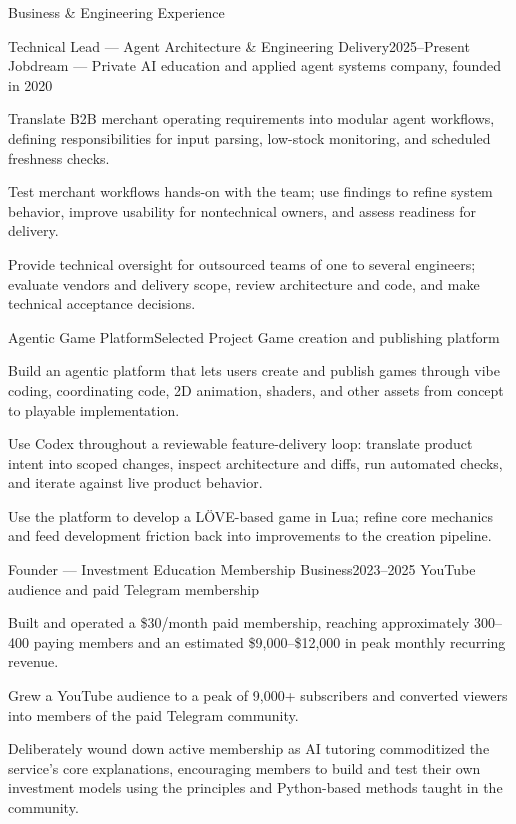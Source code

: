 \documentclass{resume}
\begin{document}
\begin{rSection}{Business \& Engineering Experience}
    \begin{rSubsection}{Technical Lead --- Agent Architecture \& Engineering Delivery}{2025--Present}
        {Jobdream --- Private AI education and applied agent systems company, founded in 2020}{}
        \item Translate B2B merchant operating requirements into modular agent workflows, defining responsibilities for input parsing, low-stock monitoring, and scheduled freshness checks.
        \item Test merchant workflows hands-on with the team; use findings to refine system behavior, improve usability for nontechnical owners, and assess readiness for delivery.
        \item Provide technical oversight for outsourced teams of one to several engineers; evaluate vendors and delivery scope, review architecture and code, and make technical acceptance decisions.
    \end{rSubsection}

    \begin{rSubsection}{Agentic Game Platform}{Selected Project}
        {Game creation and publishing platform}{}
        \item Build an agentic platform that lets users create and publish games through vibe coding, coordinating code, 2D animation, shaders, and other assets from concept to playable implementation.
        \item Use Codex throughout a reviewable feature-delivery loop: translate product intent into scoped changes, inspect architecture and diffs, run automated checks, and iterate against live product behavior.
        \item Use the platform to develop a L\"OVE-based game in Lua; refine core mechanics and feed development friction back into improvements to the creation pipeline.
    \end{rSubsection}

    \begin{rSubsection}{Founder --- Investment Education Membership Business}{2023--2025}
        {YouTube audience and paid Telegram membership}{}
        \item Built and operated a \$30/month paid membership, reaching approximately 300--400 paying members and an estimated \$9,000--\$12,000 in peak monthly recurring revenue.
        \item Grew a YouTube audience to a peak of 9,000+ subscribers and converted viewers into members of the paid Telegram community.
        \item Deliberately wound down active membership as AI tutoring commoditized the service's core explanations, encouraging members to build and test their own investment models using the principles and Python-based methods taught in the community.
    \end{rSubsection}
\end{rSection}
\end{document}
